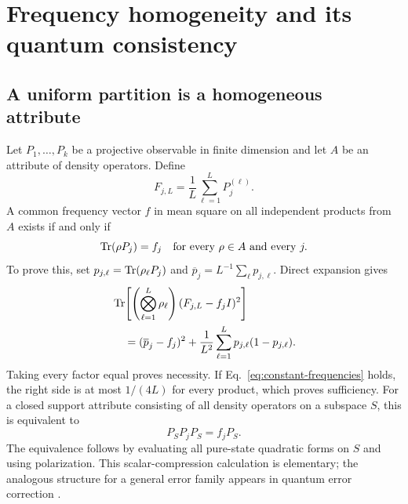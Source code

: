 \section{Frequency homogeneity and its quantum consistency}\label{app:frequency}
\subsection{A uniform partition is a homogeneous attribute}
Let $P_1,\ldots,P_k$ be a projective observable in finite dimension and let $A$ be an attribute of density operators. Define
\begin{equation}\label{eq:frequency-operator}
 F_{j,L}=\frac1L\sum_{\ell=1}^L P_j^{(\ell)}.
\end{equation}
A common frequency vector $f$ in mean square on all independent products from $A$ exists if and only if
\begin{equation}\label{eq:constant-frequencies}
 \Tr(\rho P_j)=f_j\quad\text{for every }\rho\in A\text{ and every }j.
\end{equation}
To prove this, set $p_{j,\ell}=\operatorname{Tr}(\rho_\ell P_j)$ and $\overline p_j=L^{-1}\sum_\ell p_{j,\ell}$. Direct expansion gives
\begin{equation}\label{eq:variance}
\begin{aligned}
 &\Tr\!\left[\left(\bigotimes_{\ell=1}^L\rho_\ell\right)(F_{j,L}-f_j I)^2\right]\\
 &\hspace{4mm}=(\overline p_j-f_j)^2+
 \frac1{L^2}\sum_{\ell=1}^L p_{j,\ell}(1-p_{j,\ell}).
\end{aligned}
\end{equation}
Taking every factor equal proves necessity. If Eq.~\eqref{eq:constant-frequencies} holds, the right side is at most $1/(4L)$ for every product, which proves sufficiency. For a closed support attribute consisting of all density operators on a subspace $S$, this is equivalent to
\begin{equation}\label{eq:compression}
 P_S P_j P_S=f_jP_S.
\end{equation}
The equivalence follows by evaluating all pure-state quadratic forms on $S$ and using polarization. This scalar-compression calculation is elementary; the analogous structure for a general error family appears in quantum error correction \cite{qec}.

